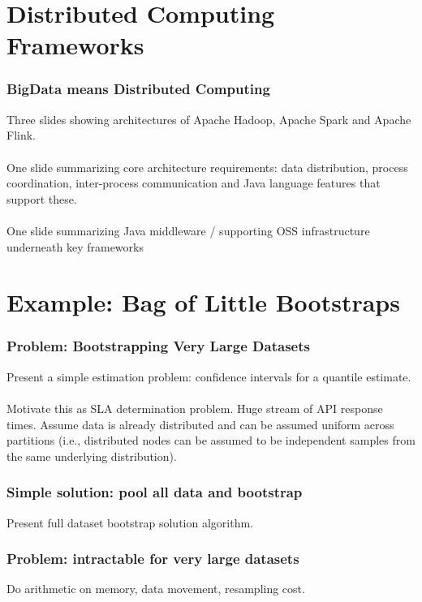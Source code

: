 \documentclass[14pt,mathserif]{beamer}
\begin{document}
\section[History]{Distributed Computing Frameworks}

\begin{frame}
  \frametitle{BigData means Distributed Computing}
Three slides showing architectures of Apache Hadoop, Apache Spark and Apache Flink.
\\
\\
One slide summarizing core architecture requirements: data distribution, process coordination, inter-process communication and Java language features that support these.
\\
\\
One slide summarizing Java middleware / supporting OSS infrastructure underneath key frameworks

\end{frame}

\section[History]{Example: Bag of Little Bootstraps}

\begin{frame}
  \frametitle{Problem: Bootstrapping Very Large Datasets}
Present a simple estimation problem: confidence intervals for a quantile estimate.  
\\
\\
Motivate this as SLA determination problem. Huge stream of API response times.  Assume data is already distributed and can be assumed uniform across partitions (i.e., distributed nodes can be assumed to be independent samples from the same underlying distribution).
\end{frame}

\begin{frame}
\frametitle{Simple solution: pool all data and bootstrap}
Present full dataset bootstrap solution algorithm.
\end{frame}

\begin{frame}
\frametitle{Problem: intractable for very large datasets}
Do arithmetic on memory, data movement, resampling cost.
\end{frame}
\end{document}
